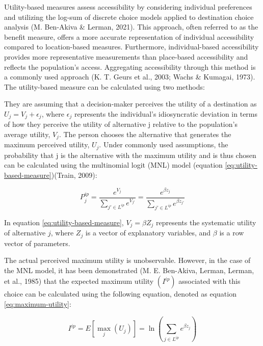 \documentclass[
11pt, %
oneside, %
english, %
singlespacing, %
]{macthesis} %
\begin{document}
Utility-based measures assess accessibility by considering individual preferences and utilizing the log-sum of discrete choice models applied to destination choice analysis (M. Ben-Akiva \& Lerman, 2021). This approach, often referred to as the benefit measure, offers a more accurate representation of individual accessibility compared to location-based measures. Furthermore, individual-based accessibility provides more representative measurements than place-based accessibility and reflects the population's access. Aggregating accessibility through this method is a commonly used approach (K. T. Geurs et al., 2003; Wachs \& Kumagai, 1973). The utility-based measure can be calculated using two methods:

They are assuming that a decision-maker perceives the utility of a destination as \(U_j = V_j + \epsilon_j\), where \(\epsilon_j\) represents the individual's idiosyncratic deviation in terms of how they perceive the utility of alternative j relative to the population's average utility, \(V_j\). The person chooses the alternative that generates the maximum perceived utility, \(U_j\). Under commonly used assumptions, the probability that j is the alternative with the maximum utility and is thus chosen can be calculated using the multinomial logit (MNL) model (equation \eqref{eq:utility-based-measure})(Train, 2009):

\begin{equation}
P_j^{ip} = \frac{e^{V_j}}{\sum_{j' \in L^{ip}} e^{V_{j'}}} = \frac{e^{\beta z_j}}{\sum_{j' \in L^{ip}} e^{\beta z_{j'}}}
\label{eq:utility-based-measure}
\end{equation}

In equation \eqref{eq:utility-based-measure}, \({V_j} = \beta{Z_j}\) represents the systematic utility of alternative \(j\), where \({Z_j}\) is a vector of explanatory variables, and \(\beta\) is a row vector of parameters.

The actual perceived maximum utility is unobservable. However, in the case of the MNL model, it has been demonstrated (M. E. Ben-Akiva, Lerman, Lerman, et al., 1985) that the expected maximum utility \((I^{ip})\) associated with this choice can be calculated using the following equation, denoted as equation \eqref{eq:maximum-utility}:

\begin{equation}
I^{ip} = E\left[ \max_j (U_j) \right] = \ln\left(\sum_{j \in L^{ip}} e^{\beta z_j} \right)
\label{eq:maximum-utility}
\end{equation}
\end{document}
